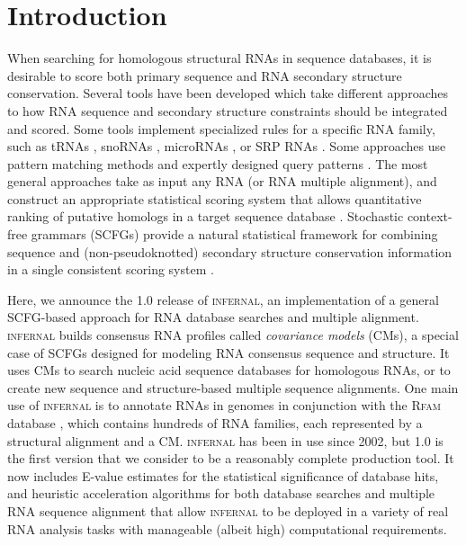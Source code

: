 \section{Introduction}

When searching for homologous structural RNAs in sequence databases, it is
desirable to score both primary sequence and RNA secondary structure
conservation. Several tools have been developed which take different
approaches to how RNA sequence and secondary structure constraints
should be integrated and scored. Some tools implement specialized
rules for a specific RNA family, such as tRNAs
\citep{LoweEddy97,Laslett04}, snoRNAs \citep{LoweEddy99,Schattner06},
microRNAs \citep{Lai03,Lim03}, or SRP RNAs \citep{Lai03,Lim03}. Some
approaches use pattern matching methods and expertly designed query
patterns \citep{Macke01}. The most general approaches take as input
any RNA (or RNA multiple alignment), and construct an appropriate
statistical scoring system that allows quantitative ranking of
putative homologs in a target sequence database
\citep{Gautheret01,ZhangBafna05}.  Stochastic context-free grammars
(SCFGs) provide a natural statistical framework for combining sequence
and (non-pseudoknotted) secondary structure conservation information
in a single consistent scoring system
\citep{Sakakibara94c,Eddy94,Brown00,Durbin98}.

Here, we announce the 1.0 release of \textsc{infernal}, an
implementation of a general SCFG-based approach for RNA database
searches and multiple alignment. \textsc{infernal} builds consensus
RNA profiles called \emph{covariance models} (CMs), a special case of
SCFGs designed for modeling RNA consensus sequence and structure. It
uses CMs to search nucleic acid sequence databases for homologous
RNAs, or to create new sequence and structure-based multiple sequence
alignments. One main use of \textsc{infernal} is to annotate RNAs in
genomes in conjunction with the \textsc{Rfam} database
\citep{Gardner09}, which contains hundreds of RNA families,
each represented by a structural alignment and a CM. \textsc{infernal}
has been in use since 2002, but 1.0 is the first version that we
consider to be a reasonably complete production tool. It now includes
E-value estimates for the statistical significance of database hits,
and heuristic acceleration algorithms for both database searches and
multiple RNA sequence alignment that allow \textsc{infernal} to be
deployed in a variety of real RNA analysis tasks with manageable
(albeit high) computational requirements.

